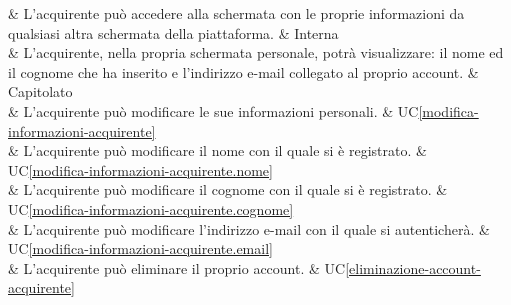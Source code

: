  & L'acquirente può accedere alla schermata con le proprie informazioni da qualsiasi altra schermata della piattaforma. & Interna \\

 & L'acquirente, nella propria schermata personale, potrà visualizzare: il nome ed il cognome che ha inserito e l'indirizzo e-mail collegato al proprio account. & Capitolato \\

 & L'acquirente può modificare le sue informazioni personali. & UC\ref{modifica-informazioni-acquirente} \\

 & L'acquirente può modificare il nome con il quale si è registrato. & UC\ref{modifica-informazioni-acquirente.nome} \\

 & L'acquirente può modificare il cognome con il quale si è registrato. & UC\ref{modifica-informazioni-acquirente.cognome} \\

 & L'acquirente può modificare l'indirizzo e-mail con il quale si autenticherà. & UC\ref{modifica-informazioni-acquirente.email} \\

 & L'acquirente può eliminare il proprio account. & UC\ref{eliminazione-account-acquirente} \\
